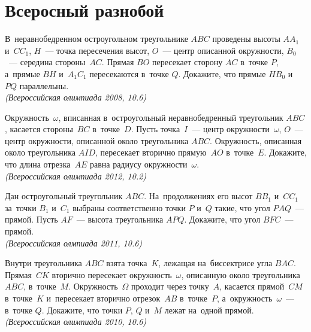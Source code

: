 

\section*{Всеросный разнобой}


\begin{problems}

\item
В~неравнобедренном остроугольном треугольнике $ABC$ проведены высоты
$A A_1$ и~$C C_1$, $H$~--- точка пересечения высот, $O$~--- центр описанной
окружности, $B_0$~--- середина стороны~$AC$.
Прямая $BO$ пересекает сторону $AC$ в~точке $P$, а~прямые $BH$ и~$A_1C_1$
пересекаются в~точке $Q$.
Докажите, что прямые $HB_0$ и~$PQ$ параллельны.
\\\emph{(Всероссийская олимпиада 2008, 10.6)}

\item
Окружность~$\omega$, вписанная в~остроугольный неравнобедренный треугольник
$ABC$, касается стороны~$BC$ в~точке~$D$.
Пусть точка~$I$~--- центр окружности~$\omega$, $O$~--- центр окружности,
описанной около треугольника $ABC$.
Окружность, описанная около треугольника $AID$, пересекает вторично прямую~$AO$
в~точке~$E$.
Докажите, что длина отрезка~$AE$ равна радиусу окружности~$\omega$.
\\\emph{(Всероссийская олимпиада 2012, 10.2)}

\item
Дан остроугольный треугольник $ABC$.
На~продолжениях его высот $B B_1$ и~$C C_1$ за~точки $B_1$ и~$C_1$ выбраны
соответственно точки $P$ и~$Q$ такие, что угол $PAQ$~--- прямой.
Пусть $AF$~--- высота треугольника $APQ$.
Докажите, что угол $BFC$~--- прямой.
\\\emph{(Всероссийская олмпиада 2011, 10.6)}

\item
Внутри треугольника $ABC$ взята точка~$K$, лежащая на~биссектрисе угла $BAC$.
Прямая~$CK$ вторично пересекает окружность~$\omega$, описанную около
треугольника $ABC$, в~точке~$M$.
Окружность~$\Omega$ проходит через точку~$A$, касается прямой~$CM$ в~точке~$K$
и~пересекает вторично отрезок~$AB$ в~точке~$P$, а~окружность~$\omega$~---
в~точке $Q$.
Докажите, что точки $P$, $Q$ и~$M$ лежат на~одной прямой.
\\\emph{(Всероссийская олимпиада 2010, 10.6)}


\end{problems}
